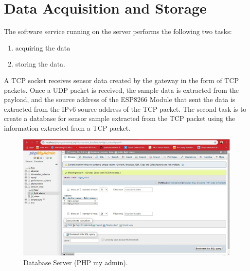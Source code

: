 \section{Data Acquisition and Storage}
The software service running on the server performs the following two tasks:
\begin{enumerate}
  \item acquiring the data
  \item storing the data.
\end{enumerate}
A TCP socket receives sensor data created by the gateway in the form of TCP packets. Once a UDP packet is received, the sample data is extracted from the payload, and the source address of the ESP8266 Module that sent the data is extracted from the IPv6 source address of the TCP packet. The second task is to create a database for sensor sample extracted from the TCP packet using the information extracted from a TCP packet.\\
\begin{figure}[h]
  \centering
  \includegraphics[width=6in]{39}
  \caption{Database Server (PHP my admin).}\label{fig39}
\end{figure}
